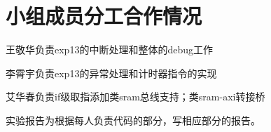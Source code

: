 \documentclass[11pt]{article}
\begin{document}
         

      
\vspace{1ex}

\section{小组成员分工合作情况}
王敬华负责exp13的中断处理和整体的debug工作

李霄宇负责exp13的异常处理和计时器指令的实现

艾华春负责if级取指添加类sram总线支持；类sram-axi转接桥

实验报告为根据每人负责代码的部分，写相应部分的报告。
\end{document}
